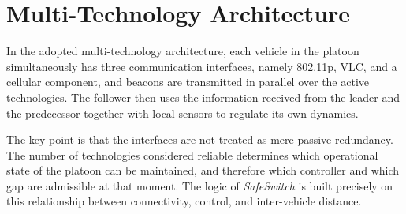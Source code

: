 \section{Multi-Technology Architecture}
\label{sec:s5g_architecture}

In the adopted multi-technology architecture, each vehicle in the platoon simultaneously has three communication interfaces, namely 802.11p, VLC, and a cellular component, and beacons are transmitted in parallel over the active technologies. The follower then uses the information received from the leader and the predecessor together with local sensors to regulate its own dynamics.

The key point is that the interfaces are not treated as mere passive redundancy. The number of technologies considered reliable determines which operational state of the platoon can be maintained, and therefore which controller and which gap are admissible at that moment. The logic of \emph{SafeSwitch} is built precisely on this relationship between connectivity, control, and inter-vehicle distance.
